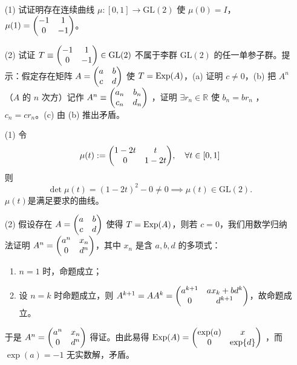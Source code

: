 \begin{xiti}
	\item \begin{enumerate}
		\item[(1)] 试证明存在连续曲线 $\mu \colon [0,1] \rightarrow \mathrm{GL}(2)$ 使 $\mu(0)=I$，$\mu(1)=\mqty(-1 & 1 \\ 0 & -1)$。
		\item[(2)] 试证 $T\equiv \mqty(-1 & 1 \\ 0 & -1) \in \mathrm{GL}(2)$ 不属于李群 $\mathrm{GL}(2)$ 的任一单参子群。提示：假定存在矩阵 $A=\mqty(a&b\\c&d)$ 使 $T=\operatorname{Exp}(A)$，(a) 证明 $c\neq 0$，(b) 把 $A^n$ （$A$ 的 $n$ 次方）记作 $A^n \equiv \mqty(a_n & b_n \\ c_n & d_n)$ ，证明 $\exists r_n\in \mathbb{R}$ 使 $b_n = b r_n$ ， $c_n=c r_n$。(c) 由 (b) 推出矛盾。
	\end{enumerate}
    
    \begin{zm}
    	\begin{enumerate}
    		\item[(1)] 令
    		\begin{displaymath}
    		\mu(t) := \mqty(1-2t & t \\ 0 & 1-2t)\qc \forall t\in [0,1]
    		\end{displaymath}
    		则
    		\begin{displaymath}
    		\det \mu(t) = \left(1-2t\right)^2 -0 \neq 0 \implies \mu(t) \in \mathrm{GL}(2).
    		\end{displaymath}
    		$\mu(t)$是满足要求的曲线。
			\item[(2)] 假设存在 $A=\mqty(a & b \\ c & d)$ 使得 $T=\operatorname{Exp}(A)$，则若 $c=0$，我们用数学归纳法证明 $A^n=\mqty(a^n & x_n \\ 0 & d^n)$，其中 $x_n$ 是含 $a,b,d$ 的多项式：
			\begin{enumerate}
				\item $n=1$ 时，命题成立；
				\item 设 $n=k$ 时命题成立，则 $A^{k+1}=A A^k= \mqty(a^{k+1} & a x_k + b d^k \\ 0 & d^{k+1})$，故命题成立。
			\end{enumerate}
			于是 $A^n=\mqty(a^n & x_n \\ 0 & d^n)$ 得证。由此易得 $\Exp(A)=\mqty(\exp(a) & x \\ 0 & \exp{d})$ ，而$\exp(a)=-1$ 无实数解，矛盾。
    	\end{enumerate}
    \end{zm}
	
\end{xiti}